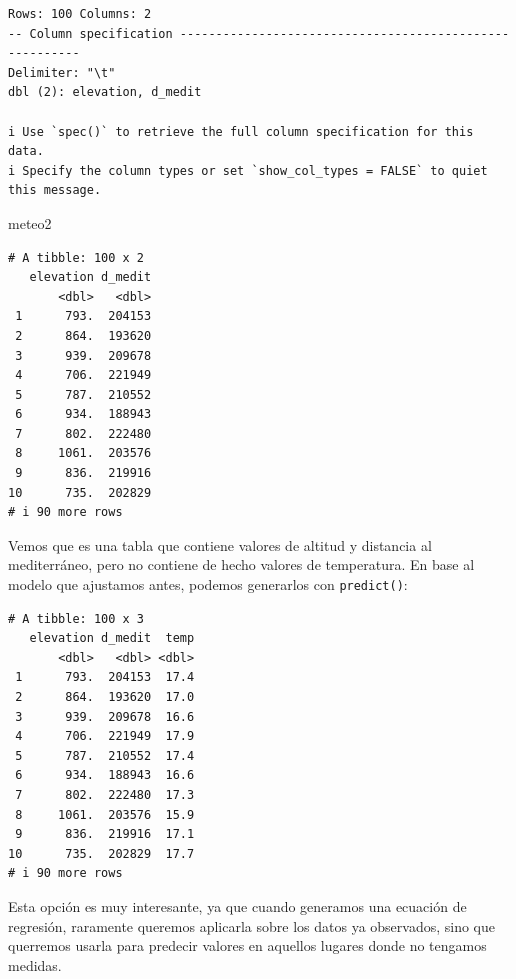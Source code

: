 \documentclass[
  letterpaper,
  DIV=11,
  numbers=noendperiod]{scrreprt}
\newenvironment{Shaded}{\begin{snugshade}}{\end{snugshade}}
\newcommand{\FunctionTok}[1]{\textcolor[rgb]{0.28,0.35,0.67}{#1}}
\newcommand{\NormalTok}[1]{\textcolor[rgb]{0.00,0.23,0.31}{#1}}
\newcommand{\OtherTok}[1]{\textcolor[rgb]{0.00,0.23,0.31}{#1}}
\newcommand{\SpecialCharTok}[1]{\textcolor[rgb]{0.37,0.37,0.37}{#1}}
\begin{document}
\begin{verbatim}
Rows: 100 Columns: 2
-- Column specification --------------------------------------------------------
Delimiter: "\t"
dbl (2): elevation, d_medit

i Use `spec()` to retrieve the full column specification for this data.
i Specify the column types or set `show_col_types = FALSE` to quiet this message.
\end{verbatim}

\begin{Shaded}
\begin{Highlighting}[]
\NormalTok{meteo2}
\end{Highlighting}
\end{Shaded}

\begin{verbatim}
# A tibble: 100 x 2
   elevation d_medit
       <dbl>   <dbl>
 1      793.  204153
 2      864.  193620
 3      939.  209678
 4      706.  221949
 5      787.  210552
 6      934.  188943
 7      802.  222480
 8     1061.  203576
 9      836.  219916
10      735.  202829
# i 90 more rows
\end{verbatim}

Vemos que es una tabla que contiene valores de altitud y distancia al
mediterráneo, pero no contiene de hecho valores de temperatura. En base
al modelo que ajustamos antes, podemos generarlos con
\texttt{predict()}:

\begin{Shaded}
\end{Shaded}

\begin{verbatim}
# A tibble: 100 x 3
   elevation d_medit  temp
       <dbl>   <dbl> <dbl>
 1      793.  204153  17.4
 2      864.  193620  17.0
 3      939.  209678  16.6
 4      706.  221949  17.9
 5      787.  210552  17.4
 6      934.  188943  16.6
 7      802.  222480  17.3
 8     1061.  203576  15.9
 9      836.  219916  17.1
10      735.  202829  17.7
# i 90 more rows
\end{verbatim}

Esta opción es muy interesante, ya que cuando generamos una ecuación de
regresión, raramente queremos aplicarla sobre los datos ya observados,
sino que querremos usarla para predecir valores en aquellos lugares
donde no tengamos medidas.
\end{document}
